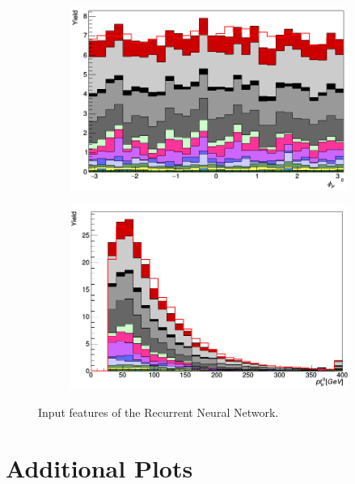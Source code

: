 \begin{figure}[H]
\begin{subfigure}{.5\textwidth}
\end{subfigure}
\begin{subfigure}{.5\textwidth}
  \centering
  \includegraphics[width=.99\linewidth]{figs/featuresRNN/mu_phi_0}
\end{subfigure}
\begin{subfigure}{.5\textwidth}
  \centering
  \includegraphics[width=.99\linewidth]{figs/featuresRNN/mu_pt_0}
\end{subfigure}
\caption{Input features of the Recurrent Neural Network.}
\end{figure}




\section*{Additional Plots}
\label{ap:addRNN}

